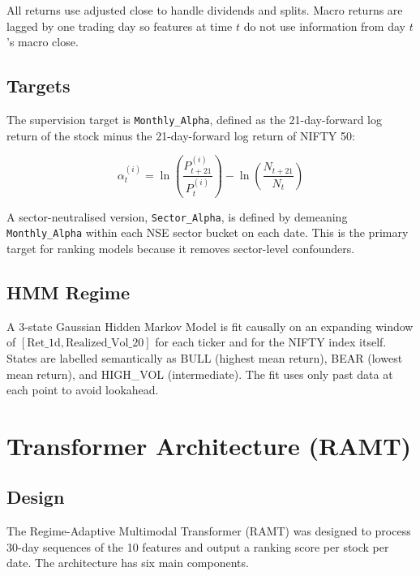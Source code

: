 \documentclass[conference]{IEEEtran}
\begin{document}
All returns use adjusted close to handle dividends and splits. Macro returns are lagged by one trading day so features at time $t$ do not use information from day $t$'s macro close.

\subsection{Targets}

The supervision target is \texttt{Monthly\_Alpha}, defined as the 21-day-forward log return of the stock minus the 21-day-forward log return of NIFTY 50:

\[
\alpha_t^{(i)} = \ln\left(\frac{P_{t+21}^{(i)}}{P_t^{(i)}}\right) - \ln\left(\frac{N_{t+21}}{N_t}\right)
\]

A sector-neutralised version, \texttt{Sector\_Alpha}, is defined by demeaning \texttt{Monthly\_Alpha} within each NSE sector bucket on each date. This is the primary target for ranking models because it removes sector-level confounders.

\subsection{HMM Regime}

A 3-state Gaussian Hidden Markov Model is fit causally on an expanding window of $[\text{Ret\_1d}, \text{Realized\_Vol\_20}]$ for each ticker and for the NIFTY index itself. States are labelled semantically as BULL (highest mean return), BEAR (lowest mean return), and HIGH\_VOL (intermediate). The fit uses only past data at each point to avoid lookahead.

\section{Transformer Architecture (RAMT)}

\subsection{Design}

The Regime-Adaptive Multimodal Transformer (RAMT) was designed to process 30-day sequences of the 10 features and output a ranking score per stock per date. The architecture has six main components.
\end{document}
